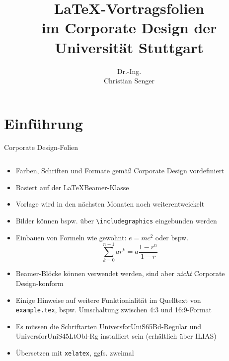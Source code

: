 \documentclass[8pt, t,
aspectratio=169,%
]{beamer}
\title[\LaTeX-Folien im CD der UniS]{\LaTeX-Vortragsfolien\\im Corporate Design der\\Universität Stuttgart}
\author[Dr.-Ing. Christian Senger]{Dr.-Ing.\\Christian Senger}
\institute{Institut für Nachrichtenübertragung (INÜ), Universität Stuttgart}
\begin{document}
\begin{frame}[plain]
  \titlepage
\end{frame}

\section{Einführung}

\begin{frame}{Corporate Design-Folien}
  \begin{columns}[c]
    \begin{column}{.7\textwidth}
      \begin{itemize}
        \item Farben, Schriften und Formate gemäß Corporate Design vordefiniert
        \item Basiert auf der \LaTeX Beamer-Klasse
        \item Vorlage wird in den nächsten Monaten noch weiterentweickelt
        \item Bilder können bspw. über \texttt{\textbackslash includegraphics} eingebunden werden
        \item \glqq Einbauen\grqq{} von Formeln wie gewohnt: $e=mc^2$ oder bspw.
          \begin{equation*}
            \sum_{k=0}^{n-1} ar^k=a\frac{1-r^n}{1-r}
          \end{equation*}
        \item Beamer-Blöcke können verwendet werden, sind aber \emph{nicht} Corporate Design-konform
        \item Einige Hinweise auf weitere Funktionialität im Quelltext von \texttt{example.tex}, bspw.
          Umschaltung zwischen 4:3 und 16:9-Format
        \item Es müssen die Schriftarten \alert{UniversforUniS65Bd-Regular} und
          \alert{UniversforUniS45LtObl-Rg} installiert sein (erhältlich über ILIAS)
        \item Übersetzen mit \texttt{xelatex}, ggfs. zweimal
      \end{itemize}
    \end{column}
    \begin{column}{.3\textwidth}

\end{column}
\end{columns}
\end{frame}
\end{document}
